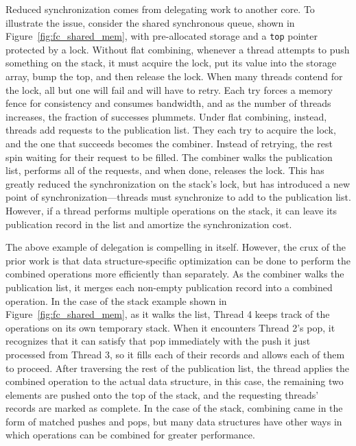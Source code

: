 

Reduced synchronization comes from delegating work to another core.
To illustrate the issue, consider the shared synchronous queue, shown in Figure~\ref{fig:fc_shared_mem}, with pre-allocated storage and a \texttt{top} pointer protected by a lock. Without flat combining, whenever a thread attempts to push something on the stack, it must acquire the lock, put its value into the storage array, bump the top, and then release the lock. When many threads contend for the lock, all but one will fail and will have to retry. Each try forces a memory fence for consistency and consumes bandwidth, and as the number of threads increases, the fraction of successes plummets. Under flat combining, instead, threads add requests to the publication list. They each try to acquire the lock, and the one that succeeds becomes the combiner. Instead of retrying, the rest spin waiting for their request to be filled. The combiner walks the publication list, performs all of the requests, and when done, releases the lock. This has greatly reduced the synchronization on the stack's lock, but has introduced a new point of synchronization---threads must synchronize to add to the publication list. However, if a thread performs multiple operations on the stack, it can leave its publication record in the list and amortize the synchronization cost.

The above example of delegation is compelling in itself. However, the crux of the prior work is that data structure-specific optimization can be done to perform the combined operations more efficiently than separately.
As the combiner walks the publication list, it merges each non-empty publication record into a combined operation. In the case of the stack example shown in Figure~\ref{fig:fc_shared_mem}, as it walks the list, Thread 4 keeps track of the operations on its own temporary stack. When it encounters Thread 2's pop, it recognizes that it can satisfy that pop immediately with the push it just processed from Thread 3, so it fills each of their records and allows each of them to proceed. After traversing the rest of the publication list, the thread applies the combined operation to the actual data structure, in this case, the remaining two elements are pushed onto the top of the stack, and the requesting threads' records are marked as complete.
In the case of the stack, combining came in the form of matched pushes and pops, but many data structures have other ways in which operations can be combined for greater performance.

